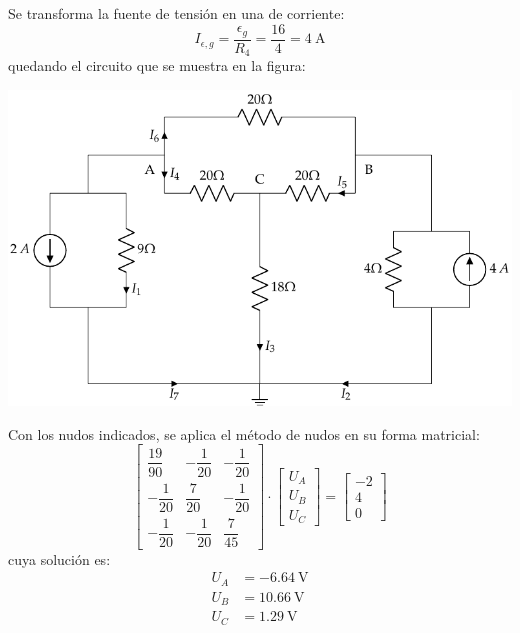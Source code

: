     Se transforma la fuente de tensión en una de corriente:
     \begin{equation*}
       I_{\epsilon,g}=\dfrac{\epsilon_g}{R_4}=\dfrac{16}{4}=\qty{4}{\ampere}
     \end{equation*}
     quedando el circuito que se muestra en la figura:
     \begin{center}
       \includegraphics{figuras/BT1_12_nudos.pdf}
     \end{center}
     Con los nudos indicados, se aplica el método de nudos en su forma
     matricial:
     \begin{equation*}
       \begin{bmatrix}
         \dfrac{19}{90} & -\dfrac{1}{20} & -\dfrac{1}{20}\\[10pt]
         -\dfrac{1}{20} & \dfrac{7}{20} & -\dfrac{1}{20}\\[10pt]
         -\dfrac{1}{20} & -\dfrac{1}{20} & \dfrac{7}{45}
       \end{bmatrix}
       \cdot
       \begin{bmatrix}
         U_A\\
         U_B\\
         U_C
       \end{bmatrix}
       =
       \begin{bmatrix}
         -2\\
         4\\
         0
       \end{bmatrix}
     \end{equation*}
     cuya solución es:
     \begin{align*}
       U_A&=\qty{-6.64}{\volt}\\
       U_B&=\qty{10.66}{\volt}\\
       U_C&=\qty{1.29}{\volt}\\
     \end{align*}
